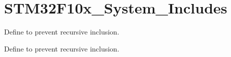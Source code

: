 \hypertarget{group___s_t_m32_f10x___system___includes}{}\section{S\+T\+M32\+F10x\+\_\+\+System\+\_\+\+Includes}
\label{group___s_t_m32_f10x___system___includes}


Define to prevent recursive inclusion.  


Define to prevent recursive inclusion. 

